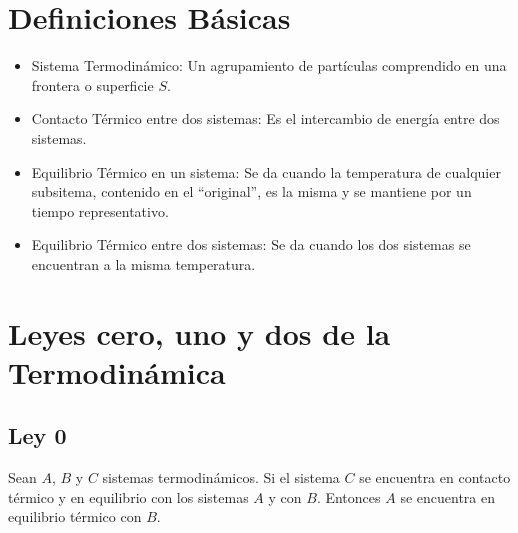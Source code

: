 \section{Definiciones Básicas}

\begin{itemize}
    \item Sistema Termodinámico:
    Un agrupamiento de partículas comprendido en una frontera o
    superficie $S$.
    \item Contacto Térmico entre dos sistemas:
    Es el intercambio de energía entre dos sistemas.
    \item Equilibrio Térmico en un sistema:
    Se da cuando la temperatura de cualquier subsitema, contenido en el
    ``original'', es la misma y se mantiene por un tiempo
    representativo.
    \item Equilibrio Térmico entre dos sistemas:
    Se da cuando los dos sistemas se encuentran a la misma temperatura.
\end{itemize}

\section{Leyes cero, uno y dos de la Termodinámica}

\subsection{Ley 0}
Sean $A$, $B$ y $C$ sistemas termodinámicos. Si el sistema $C$ se
encuentra en contacto térmico y en equilibrio con los sistemas $A$ y
con $B$. Entonces $A$ se encuentra en equilibrio térmico con $B$.

\begin{center}
\end{center}

